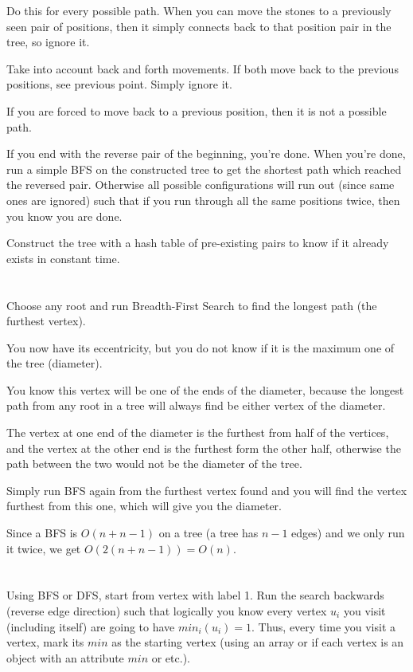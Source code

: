 \documentclass[11pt,letterpaper]{article}
\begin{document}
	Do this for every possible path. When you can move the stones to a previously seen pair of positions, then it simply connects back to that position pair in the tree, so ignore it.
	
	Take into account back and forth movements. If both move back to the previous positions, see previous point. Simply ignore it.
	
	If you are forced to move back to a previous position, then it is not a possible path.
	
	If you end with the reverse pair of the beginning, you're done.
	When you're done, run a simple BFS on the constructed tree to get the shortest path which reached the reversed pair.
	Otherwise all possible configurations will run out (since same ones are ignored) such that if you run through all the same positions twice, then you know you are done.
	
	Construct the tree with a hash table of pre-existing pairs to know if it already exists in constant time.
	
	\section{}
	Choose any root and run Breadth-First Search to find the longest path (the furthest vertex).
	
	You now have its eccentricity, but you do not know if it is the maximum one of the tree (diameter).
	
	You know this vertex will be one of the ends of the diameter, because the longest path from any root in a tree will always find be either vertex of the diameter.
	
	The vertex at one end of the diameter is the furthest from half of the vertices, and the vertex at the other end is the furthest form the other half, otherwise the path between the two would not be the diameter of the tree.
	
	Simply run BFS again from the furthest vertex found and you will find the vertex furthest from this one, which will give you the diameter.
	
	Since a BFS is $O(n+n-1)$ on a tree (a tree has $n-1$ edges) and we only run it twice, we get $O(2(n+n-1))=O(n)$.
	
	\section{}
	Using BFS or DFS, start from vertex with label 1. Run the search backwards (reverse edge direction) such that logically you know every vertex $u_i$ you visit (including itself) are going to have $min_i(u_i)=1$. Thus, every time you visit a vertex, mark its $min$ as the starting vertex (using an array or if each vertex is an object with an attribute $min$ or etc.).
	
\end{document}
